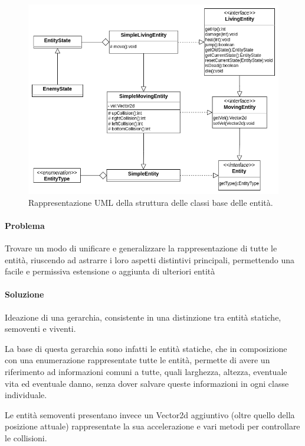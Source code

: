 \documentclass[a4paper,12pt]{report}
\begin{document}
\begin{figure}[H]
\centering{}
\includegraphics[scale=0.5] {img/entities-general.png}
\caption{Rappresentazione UML della struttura delle classi base delle entità.}
\label{img:entities-general}
\end{figure}

\paragraph{Problema} Trovare un modo di unificare e generalizzare la rappresentazione di tutte le entità, riuscendo ad astrarre i loro aspetti distintivi principali, permettendo una facile e permissiva estensione o aggiunta di ulteriori entità

\paragraph{Soluzione} Ideazione di una gerarchia, consistente in una distinzione tra entità statiche, semoventi e viventi. 

La base di questa gerarchia sono infatti le entità statiche, che in composizione con una enumerazione rappresentate tutte le entità, permette di avere un riferimento ad informazioni comuni a tutte, quali larghezza, altezza, eventuale vita ed eventuale danno, senza dover salvare queste informazioni in ogni classe individuale. 

Le entità semoventi presentano invece un Vector2d aggiuntivo (oltre quello della posizione attuale) rappresentate la sua accelerazione e vari metodi per controllare le collisioni.
\end{document}
